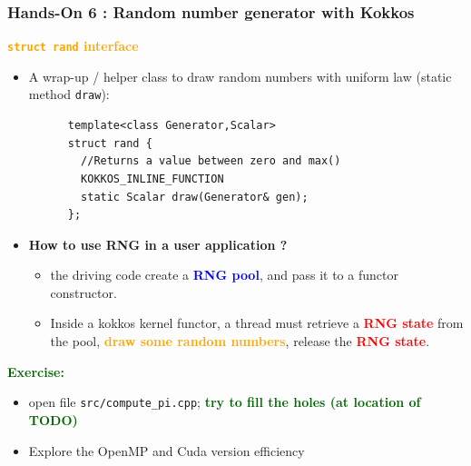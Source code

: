 \begin{frame}[fragile=singleslide]
  \frametitle{Hands-On 6 : Random number generator with Kokkos}

  \textcolor{orange}{\bf \large \texttt{struct rand} interface}
  \begin{itemize}
  \item A wrap-up / helper class to draw random numbers with uniform law (static method \texttt{draw}):
    \begin{verbatim}
      template<class Generator,Scalar>
      struct rand {
        //Returns a value between zero and max()
        KOKKOS_INLINE_FUNCTION
        static Scalar draw(Generator& gen);
      };
    \end{verbatim}
  \item {\bf How to use RNG in a user application ?}
    \begin{itemize}
    \item the driving code create a \textcolor{blue}{\bf RNG pool}, and pass it to a functor constructor.
    \item Inside a kokkos kernel functor, a thread must retrieve a \textcolor{red}{\bf RNG state} from the pool, \textcolor{orange}{\bf draw some random numbers}, release the \textcolor{red}{\bf RNG state}.
    \end{itemize}
  \end{itemize}
  
  \textcolor{darkgreen}{\bf \large Exercise:}
  \begin{itemize}
  \item open file \texttt{src/compute\_pi.cpp}; \textcolor{darkgreen}{\bf try to fill the holes (at location of TODO)}
  \item Explore the OpenMP and Cuda version efficiency
  \end{itemize}
  
\end{frame}